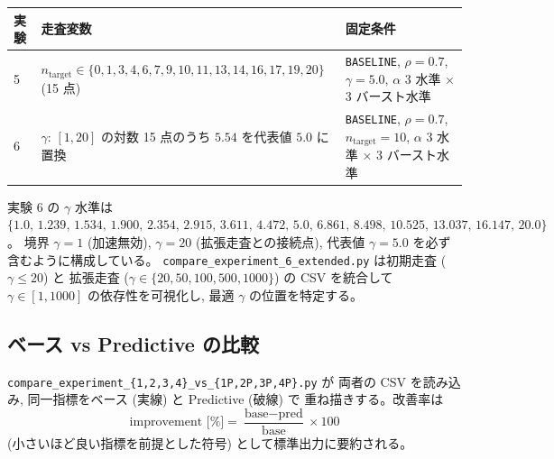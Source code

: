 \documentclass[a4paper,11pt]{article}
\newcommand{\code}[1]{\texttt{#1}}
\begin{document}
\begin{center}
\begin{tabular}{p{}p{}p{}}
\toprule
実験 & 走査変数 & 固定条件 \\
\midrule
5 & $n_{\mathrm{target}}\in\{0,1,3,4,6,7,9,10,11,13,14,16,17,19,20\}$ (15 点)
  & \code{BASELINE}, $\rho=0.7$, $\gamma=5.0$,
    $\alpha$ 3 水準 $\times$ 3 バースト水準 \\
6 & $\gamma$: $[1,20]$ の対数 15 点のうち $5.54$ を代表値 $5.0$ に置換
  & \code{BASELINE}, $\rho=0.7$, $n_{\mathrm{target}}=10$,
    $\alpha$ 3 水準 $\times$ 3 バースト水準 \\
\bottomrule
\end{tabular}
\end{center}

実験 6 の $\gamma$ 水準は
$\{1.0,\,1.239,\,1.534,\,1.900,\,2.354,\,2.915,\,3.611,\,4.472,\,5.0,\,6.861,\,
8.498,\,10.525,\,13.037,\,16.147,\,20.0\}$。
境界 $\gamma=1$ (加速無効), $\gamma=20$ (拡張走査との接続点),
代表値 $\gamma=5.0$ を必ず含むように構成している。
\code{compare\_experiment\_6\_extended.py} は初期走査 ($\gamma\le20$) と
拡張走査 ($\gamma\in\{20,50,100,500,1000\}$) の CSV を統合して
$\gamma\in[1,1000]$ の依存性を可視化し, 最適 $\gamma$ の位置を特定する。

\subsection{ベース vs Predictive の比較}

\code{compare\_experiment\_\{1,2,3,4\}\_vs\_\{1P,2P,3P,4P\}.py} が
両者の CSV を読み込み, 同一指標をベース (実線) と Predictive (破線) で
重ね描きする。改善率は
\begin{equation}
  \text{improvement [\%]}=\frac{\text{base}-\text{pred}}{\text{base}}\times100
\end{equation}
(小さいほど良い指標を前提とした符号) として標準出力に要約される。
\end{document}
